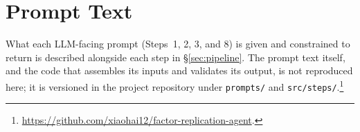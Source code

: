 \section{Prompt Text}
\label{app:prompts}

What each LLM-facing prompt (Steps~1, 2, 3, and 8) is given and constrained
to return is described alongside each step in \S\ref{sec:pipeline}. The
prompt text itself, and the code that assembles its inputs and validates its
output, is not reproduced here; it is versioned in the project repository
under \texttt{prompts/} and \texttt{src/steps/}.\footnote{\url{https://github.com/xiaohai12/factor-replication-agent}.}

